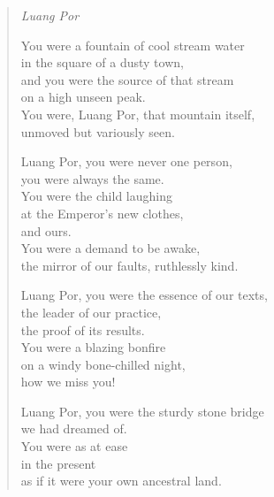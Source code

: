 
\thispagestyle{empty}

\begin{verse}
\emph{Luang Por}

You were a fountain of cool stream water\\
in the square of a dusty town,\\
and you were the source of that stream\\
on a high unseen peak.\\
You were, Luang Por, that mountain itself,\\
unmoved but variously seen.

Luang Por, you were never one person,\\
you were always the same.\\
You were the child laughing\\
at the Emperor's new clothes,\\
and ours.\\
You were a demand to be awake,\\
the mirror of our faults, ruthlessly kind.

Luang Por, you were the essence of our texts,\\
the leader of our practice,\\
the proof of its results.\\
You were a blazing bonfire\\
on a windy bone-chilled night,\\
how we miss you!

Luang Por, you were the sturdy stone bridge\\
we had dreamed of.\\
You were as at ease\\
in the present\\
as if it were your own ancestral land.

\end{verse}

\clearpage
\thispagestyle{empty}

